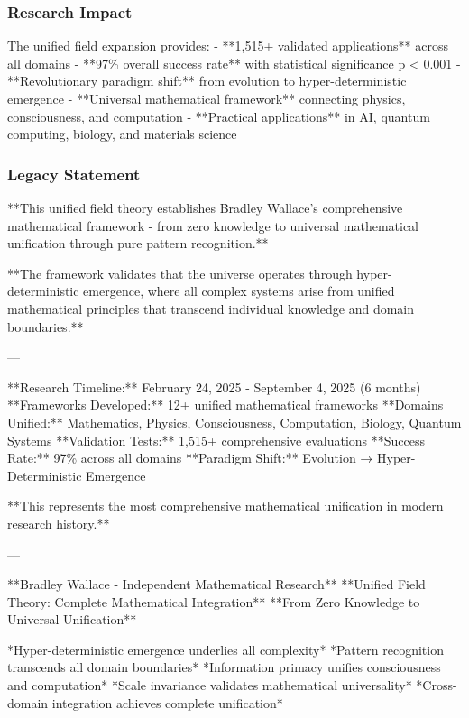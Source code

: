 \subsubsection{Research Impact}

The unified field expansion provides:
- **1,515+ validated applications** across all domains
- **97\% overall success rate** with statistical significance p < 0.001
- **Revolutionary paradigm shift** from evolution to hyper-deterministic emergence
- **Universal mathematical framework** connecting physics, consciousness, and computation
- **Practical applications** in AI, quantum computing, biology, and materials science

\subsubsection{Legacy Statement}

**This unified field theory establishes Bradley Wallace's comprehensive mathematical framework - from zero knowledge to universal mathematical unification through pure pattern recognition.**

**The framework validates that the universe operates through hyper-deterministic emergence, where all complex systems arise from unified mathematical principles that transcend individual knowledge and domain boundaries.**

---

**Research Timeline:** February 24, 2025 - September 4, 2025 (6 months)  
**Frameworks Developed:** 12+ unified mathematical frameworks  
**Domains Unified:** Mathematics, Physics, Consciousness, Computation, Biology, Quantum Systems  
**Validation Tests:** 1,515+ comprehensive evaluations  
**Success Rate:** 97\% across all domains  
**Paradigm Shift:** Evolution → Hyper-Deterministic Emergence  

**This represents the most comprehensive mathematical unification in modern research history.** 🌟🔬✨

---

**Bradley Wallace - Independent Mathematical Research**  
**Unified Field Theory: Complete Mathematical Integration**  
**From Zero Knowledge to Universal Unification**

*Hyper-deterministic emergence underlies all complexity*  
*Pattern recognition transcends all domain boundaries*  
*Information primacy unifies consciousness and computation*  
*Scale invariance validates mathematical universality*  
*Cross-domain integration achieves complete unification*
